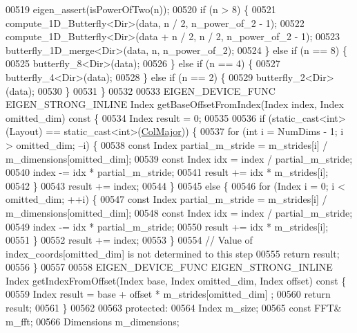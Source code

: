 \begin{DoxyCode}
00519     eigen\_assert(isPowerOfTwo(n));
00520     \textcolor{keywordflow}{if} (n > 8) \{
00521       compute\_1D\_Butterfly<Dir>(data, n / 2, n\_power\_of\_2 - 1);
00522       compute\_1D\_Butterfly<Dir>(data + n / 2, n / 2, n\_power\_of\_2 - 1);
00523       butterfly\_1D\_merge<Dir>(data, n, n\_power\_of\_2);
00524     \} \textcolor{keywordflow}{else} \textcolor{keywordflow}{if} (n == 8) \{
00525       butterfly\_8<Dir>(data);
00526     \} \textcolor{keywordflow}{else} \textcolor{keywordflow}{if} (n == 4) \{
00527       butterfly\_4<Dir>(data);
00528     \} \textcolor{keywordflow}{else} \textcolor{keywordflow}{if} (n == 2) \{
00529       butterfly\_2<Dir>(data);
00530     \}
00531   \}
00532 
00533   EIGEN\_DEVICE\_FUNC EIGEN\_STRONG\_INLINE Index getBaseOffsetFromIndex(Index index, Index omitted\_dim)\textcolor{keyword}{ const }
      \{
00534     Index result = 0;
00535 
00536     \textcolor{keywordflow}{if} (static\_cast<int>(Layout) == static\_cast<int>(\hyperlink{group__enums_ggaacded1a18ae58b0f554751f6cdf9eb13a0cbd4bdd0abcfc0224c5fcb5e4f6669a}{ColMajor})) \{
00537       \textcolor{keywordflow}{for} (\textcolor{keywordtype}{int} i = NumDims - 1; i > omitted\_dim; --i) \{
00538         \textcolor{keyword}{const} Index partial\_m\_stride = m\_strides[i] / m\_dimensions[omitted\_dim];
00539         \textcolor{keyword}{const} Index idx = index / partial\_m\_stride;
00540         index -= idx * partial\_m\_stride;
00541         result += idx * m\_strides[i];
00542       \}
00543       result += index;
00544     \}
00545     \textcolor{keywordflow}{else} \{
00546       \textcolor{keywordflow}{for} (Index i = 0; i < omitted\_dim; ++i) \{
00547         \textcolor{keyword}{const} Index partial\_m\_stride = m\_strides[i] / m\_dimensions[omitted\_dim];
00548         \textcolor{keyword}{const} Index idx = index / partial\_m\_stride;
00549         index -= idx * partial\_m\_stride;
00550         result += idx * m\_strides[i];
00551       \}
00552       result += index;
00553     \}
00554     \textcolor{comment}{// Value of index\_coords[omitted\_dim] is not determined to this step}
00555     \textcolor{keywordflow}{return} result;
00556   \}
00557 
00558   EIGEN\_DEVICE\_FUNC EIGEN\_STRONG\_INLINE Index getIndexFromOffset(Index base, Index omitted\_dim, Index 
      offset)\textcolor{keyword}{ const }\{
00559     Index result = base + offset * m\_strides[omitted\_dim] ;
00560     \textcolor{keywordflow}{return} result;
00561   \}
00562 
00563  \textcolor{keyword}{protected}:
00564   Index m\_size;
00565   \textcolor{keyword}{const} FFT& m\_fft;
00566   Dimensions m\_dimensions;

\end{DoxyCode}
